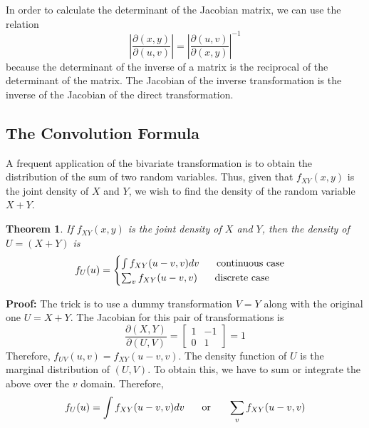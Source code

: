 \documentclass{article}
\newtheorem{theorem}{Theorem}[section]
\begin{document}
In order to calculate the determinant of the Jacobian matrix, we can use the relation
\begin{equation*}
    \left|\frac{\partial (x,y)}{\partial (u,v)} \right|=\left|\frac{\partial (u,v)}{\partial (x,y)} \right|^{-1}
\end{equation*}
because the determinant of the inverse of a matrix is the reciprocal of the determinant of the matrix. The Jacobian of the inverse transformation is the inverse of the Jacobian of the direct transformation.

\subsection{The Convolution Formula}

A frequent application of the bivariate transformation is to obtain the distribution of the sum of two random variables. Thus, given that \(f_{XY}(x,y)\) is the joint density of \(X\) and \(Y\), we wish to find the density of the random variable \(X+Y\).

\begin{theorem}
    If \(f_{XY}(x,y)\) is the joint density of \(X\) and \(Y\), then the density of \(U=(X+Y)\) is
    \begin{equation*}
        f_U(u)=
        \begin{cases}
            \int f_{XY}(u-v,v)dv \hspace{0.5cm} \text{ continuous case} \\
            \sum_v f_{XY}(u-v,v) \hspace{0.5cm} \text{ discrete case}
        \end{cases}
    \end{equation*}
\end{theorem}
\textbf{Proof:} The trick is to use a dummy transformation \(V=Y\) along with the original one \(U=X+Y\). The Jacobian for this pair of transformations is
\begin{equation*}
    \frac{\partial(X,Y)}{\partial(U,V)} = 
    \begin{bmatrix}
        1 & -1 \\
        0 & 1
    \end{bmatrix}
    = 1
\end{equation*}
Therefore, \(f_{UV}(u,v)=f_{XY}(u-v,v)\). The density function of \(U\) is the marginal distribution of \((U,V)\). To obtain this, we have to sum or integrate the above over the \(v\) domain. Therefore,
\begin{equation*}
    f_U(u)=\int f_{XY}(u-v,v)dv \hspace{0.5cm} \text{ or } \hspace{0.5cm} \sum_v f_{XY}(u-v,v)
\end{equation*}
\end{document}

